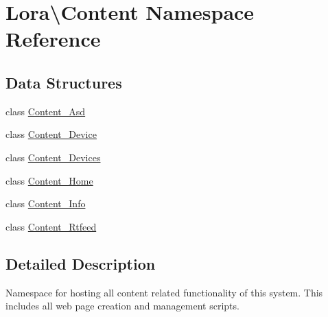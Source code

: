 \hypertarget{namespace_lora_1_1_content}{}\section{Lora\textbackslash{}Content Namespace Reference}
\label{namespace_lora_1_1_content}
\subsection*{Data Structures}
\begin{DoxyCompactItemize}
\item 
class \hyperlink{class_lora_1_1_content_1_1_content___asd}{Content\+\_\+\+Asd}
\item 
class \hyperlink{class_lora_1_1_content_1_1_content___device}{Content\+\_\+\+Device}
\item 
class \hyperlink{class_lora_1_1_content_1_1_content___devices}{Content\+\_\+\+Devices}
\item 
class \hyperlink{class_lora_1_1_content_1_1_content___home}{Content\+\_\+\+Home}
\item 
class \hyperlink{class_lora_1_1_content_1_1_content___info}{Content\+\_\+\+Info}
\item 
class \hyperlink{class_lora_1_1_content_1_1_content___rtfeed}{Content\+\_\+\+Rtfeed}
\end{DoxyCompactItemize}


\subsection{Detailed Description}
Namespace for hosting all content related functionality of this system. This includes all web page creation and management scripts. 